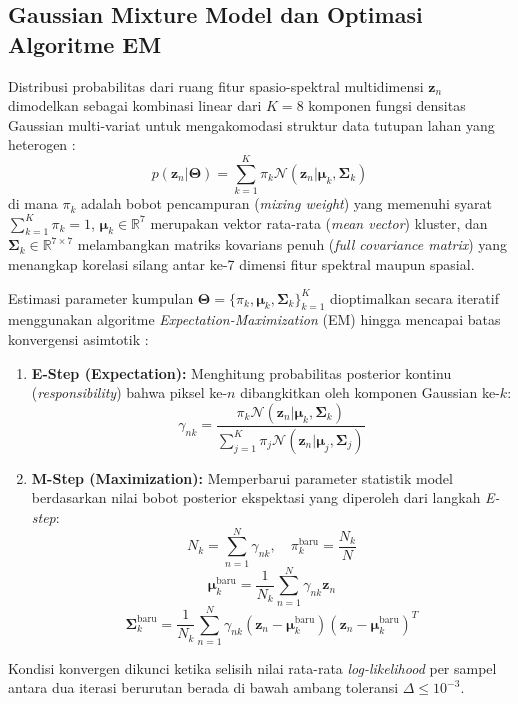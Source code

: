 \documentclass[11pt,twoside]{article}
\begin{document}
\subsection{Gaussian Mixture Model dan Optimasi Algoritme EM}
Distribusi probabilitas dari ruang fitur spasio-spektral multidimensi $\mathbf{z}_n$ dimodelkan sebagai kombinasi linear dari $K = 8$ komponen fungsi densitas Gaussian multi-variat untuk mengakomodasi struktur data tutupan lahan yang heterogen \cite{bishop2006pattern}:
\begin{equation}
    p(\mathbf{z}_n | \boldsymbol{\Theta}) = \sum_{k=1}^{K} \pi_k \mathcal{N}(\mathbf{z}_n | \boldsymbol{\mu}_k, \boldsymbol{\Sigma}_k)
\end{equation}
di mana $\pi_k$ adalah bobot pencampuran (\textit{mixing weight}) yang memenuhi syarat $\sum_{k=1}^K \pi_k = 1$, $\boldsymbol{\mu}_k \in \mathbb{R}^7$ merupakan vektor rata-rata (\textit{mean vector}) kluster, dan $\boldsymbol{\Sigma}_k \in \mathbb{R}^{7 \times 7}$ melambangkan matriks kovarians penuh (\textit{full covariance matrix}) yang menangkap korelasi silang antar ke-7 dimensi fitur spektral maupun spasial.

Estimasi parameter kumpulan $\boldsymbol{\Theta} = \{\pi_k, \boldsymbol{\mu}_k, \boldsymbol{\Sigma}_k\}_{k=1}^K$ dioptimalkan secara iteratif menggunakan algoritme \textit{Expectation-Maximization} (EM) hingga mencapai batas konvergensi asimtotik \cite{dempster1977maximum}:
\begin{enumerate}
    \item \textbf{E-Step (Expectation):} Menghitung probabilitas posterior kontinu (\textit{responsibility}) bahwa piksel ke-$n$ dibangkitkan oleh komponen Gaussian ke-$k$:
    \begin{equation}
        \gamma_{nk} = \frac{\pi_k \mathcal{N}(\mathbf{z}_n | \boldsymbol{\mu}_k, \boldsymbol{\Sigma}_k)}{\sum_{j=1}^{K} \pi_j \mathcal{N}(\mathbf{z}_n | \boldsymbol{\mu}_j, \boldsymbol{\Sigma}_j)}
    \end{equation}
    \item \textbf{M-Step (Maximization):} Memperbarui parameter statistik model berdasarkan nilai bobot posterior ekspektasi yang diperoleh dari langkah \textit{E-step}:
    \begin{equation}
        N_k = \sum_{n=1}^{N} \gamma_{nk}, \quad \pi_k^{\text{baru}} = \frac{N_k}{N}
    \end{equation}
    \begin{equation}
        \boldsymbol{\mu}_k^{\text{baru}} = \frac{1}{N_k} \sum_{n=1}^{N} \gamma_{nk} \mathbf{z}_n
    \end{equation}
    \begin{equation}
        \boldsymbol{\Sigma}_k^{\text{baru}} = \frac{1}{N_k} \sum_{n=1}^{N} \gamma_{nk} (\mathbf{z}_n - \boldsymbol{\mu}_k^{\text{baru}})(\mathbf{z}_n - \boldsymbol{\mu}_k^{\text{baru}})^T
    \end{equation}
\end{enumerate}
Kondisi konvergen dikunci ketika selisih nilai rata-rata \textit{log-likelihood} per sampel antara dua iterasi berurutan berada di bawah ambang toleransi $\Delta \le 10^{-3}$.
\end{document}
